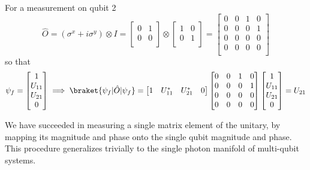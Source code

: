 For a measurement on qubit 2
\begin{equation}
    \hat{O}=(\sigma^{x} + i\sigma^{y}) \otimes I=
    \begin{bmatrix}
        0 & 1\\
        0 & 0\\
    \end{bmatrix}
    \otimes
    \begin{bmatrix}
        1 & 0\\
        0 & 1\\
    \end{bmatrix}
    =
    \begin{bmatrix}
        0 & 0 & 1 & 0\\
        0 & 0 & 0 & 1\\
        0 & 0 & 0 & 0\\
        0 & 0 & 0 & 0\\
    \end{bmatrix}
\end{equation}
so that
\begin{equation}
    \psi_{f}=
    \begin{bmatrix}
        1 \\
        U_{11} \\
        U_{21} \\
        0 \\
    \end{bmatrix}
    \implies
    \braket{\psi_{f}|\hat{O}|\psi_{f}} =
    \begin{bmatrix}
        1 & U_{11}^{*} & U_{21}^{*} & 0
    \end{bmatrix}
    \begin{bmatrix}
        0 & 0 & 1 & 0\\
        0 & 0 & 0 & 1\\
        0 & 0 & 0 & 0\\
        0 & 0 & 0 & 0\\
    \end{bmatrix}
    \begin{bmatrix}
        1 \\
        U_{11} \\
        U_{21} \\
        0 \\
    \end{bmatrix}
    = U_{21}
\end{equation}

We have succeeded in measuring a single matrix element of the unitary, by mapping its magnitude and phase onto the single qubit magnitude and phase.
This procedure generalizes trivially to the single photon manifold of multi-qubit systems.
